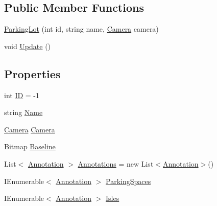 \subsection*{Public Member Functions}
\begin{DoxyCompactItemize}
\item 
\mbox{\hyperlink{class_eagle_eye_1_1_models_1_1_parking_lot_a02ac70305c0a604f9123ccdb0aa5d323}{Parking\+Lot}} (int id, string name, \mbox{\hyperlink{class_eagle_eye_1_1_models_1_1_camera}{Camera}} camera)
\item 
void \mbox{\hyperlink{class_eagle_eye_1_1_models_1_1_parking_lot_a7e3c86f8ba1c0de2e4d0a2ec7d14a653}{Update}} ()
\end{DoxyCompactItemize}
\subsection*{Properties}
\begin{DoxyCompactItemize}
\item 
int \mbox{\hyperlink{class_eagle_eye_1_1_models_1_1_parking_lot_a947f098cf468fb7856e4b72432318a72}{ID}} = -\/1
\item 
string \mbox{\hyperlink{class_eagle_eye_1_1_models_1_1_parking_lot_ac2860bd9c6046f6f6b9b10461c0b4619}{Name}}
\item 
\mbox{\hyperlink{class_eagle_eye_1_1_models_1_1_camera}{Camera}} \mbox{\hyperlink{class_eagle_eye_1_1_models_1_1_parking_lot_acc11c12c8ab93ee8fa96894f20df38b3}{Camera}}
\item 
Bitmap \mbox{\hyperlink{class_eagle_eye_1_1_models_1_1_parking_lot_a1084b858315b2b9c303ec35dca58fe74}{Baseline}}
\item 
List$<$ \mbox{\hyperlink{class_eagle_eye_1_1_models_1_1_annotation}{Annotation}} $>$ \mbox{\hyperlink{class_eagle_eye_1_1_models_1_1_parking_lot_a8a80d92c49b0671de35a6649411a8593}{Annotations}} = new List$<$\mbox{\hyperlink{class_eagle_eye_1_1_models_1_1_annotation}{Annotation}}$>$()
\item 
I\+Enumerable$<$ \mbox{\hyperlink{class_eagle_eye_1_1_models_1_1_annotation}{Annotation}} $>$ \mbox{\hyperlink{class_eagle_eye_1_1_models_1_1_parking_lot_af3127595a546a4f0b4c4dcda6e72fc3f}{Parking\+Spaces}}
\item 
I\+Enumerable$<$ \mbox{\hyperlink{class_eagle_eye_1_1_models_1_1_annotation}{Annotation}} $>$ \mbox{\hyperlink{class_eagle_eye_1_1_models_1_1_parking_lot_ac1070fa7799989793d2b8cf0c54318b3}{Isles}}
\end{DoxyCompactItemize}


